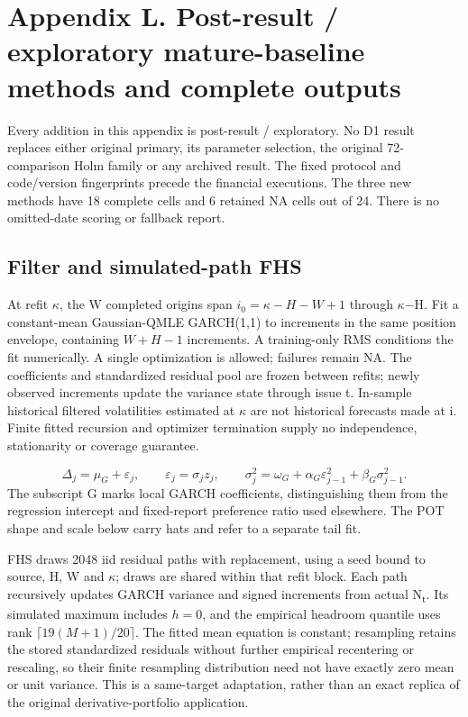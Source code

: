 \documentclass[10pt,a4paper]{article}
\begin{document}
\section*{Appendix L. Post-result / exploratory mature-baseline methods and complete outputs}
Every addition in this appendix is post-result / exploratory. No D1 result replaces either original primary, its parameter selection, the original 72-comparison Holm family or any archived result. The fixed protocol and code/version fingerprints precede the financial executions. The three new methods have 18 complete cells and 6 retained NA cells out of 24. There is no omitted-date scoring or fallback report.

\subsection*{Filter and simulated-path FHS}
At refit \(\kappa\), the W completed origins span \(i_0=\kappa-H-W+1\) through \(\kappa\)\(-\)H. Fit a constant-mean Gaussian-QMLE GARCH(1,1) to increments in the same position envelope, containing \(W+H-1\) increments. A training-only RMS conditions the fit numerically. A single optimization is allowed; failures remain NA. The coefficients and standardized residual pool are frozen between refits; newly observed increments update the variance state through issue t. In-sample historical filtered volatilities estimated at \(\kappa\) are not historical forecasts made at i. Finite fitted recursion and optimizer termination supply no independence, stationarity or coverage guarantee.

\[
\Delta_j=\mu_G+\varepsilon_j,\qquad\varepsilon_j=\sigma_j z_j,\qquad\sigma_j^2=\omega_G+\alpha_G\varepsilon_{j-1}^2+\beta_G\sigma_{j-1}^2.
\]
The subscript G marks local GARCH coefficients, distinguishing them from the regression intercept and fixed-report preference ratio used elsewhere. The POT shape and scale below carry hats and refer to a separate tail fit.

FHS draws 2048 iid residual paths with replacement, using a seed bound to source, H, W and \(\kappa\); draws are shared within that refit block. Each path recursively updates GARCH variance and signed increments from actual N\textsubscript{t}. Its simulated maximum includes \(h=0\), and the empirical headroom quantile uses rank \(\lceil19(M+1)/20\rceil\). The fitted mean equation is constant; resampling retains the stored standardized residuals without further empirical recentering or rescaling, so their finite resampling distribution need not have exactly zero mean or unit variance. This is a same-target adaptation, rather than an exact replica of the original derivative-portfolio application.
\end{document}
